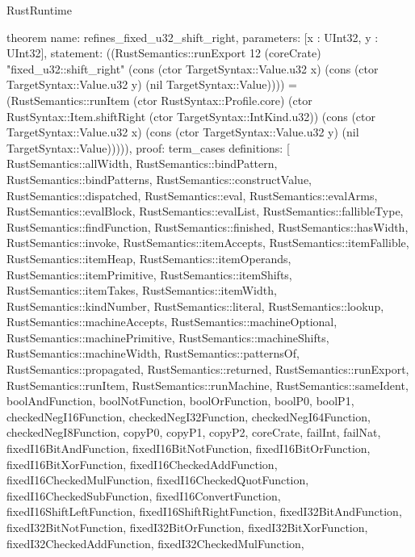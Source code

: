 \begin{lexlean}{RustRuntime}
\begin{semanticmodule}
theorem{
  name: refines_fixed_u32_shift_right,
  parameters: [x : UInt32, y : UInt32],
  statement: ((RustSemantics::runExport 12 (coreCrate) "fixed_u32::shift_right" (cons (ctor TargetSyntax::Value.u32 x) (cons (ctor TargetSyntax::Value.u32 y) (nil TargetSyntax::Value)))) = (RustSemantics::runItem (ctor RustSyntax::Profile.core) (ctor RustSyntax::Item.shiftRight (ctor TargetSyntax::IntKind.u32)) (cons (ctor TargetSyntax::Value.u32 x) (cons (ctor TargetSyntax::Value.u32 y) (nil TargetSyntax::Value))))),
  proof: term_cases{
    definitions: [
      RustSemantics::allWidth,
      RustSemantics::bindPattern,
      RustSemantics::bindPatterns,
      RustSemantics::constructValue,
      RustSemantics::dispatched,
      RustSemantics::eval,
      RustSemantics::evalArms,
      RustSemantics::evalBlock,
      RustSemantics::evalList,
      RustSemantics::fallibleType,
      RustSemantics::findFunction,
      RustSemantics::finished,
      RustSemantics::hasWidth,
      RustSemantics::invoke,
      RustSemantics::itemAccepts,
      RustSemantics::itemFallible,
      RustSemantics::itemHeap,
      RustSemantics::itemOperands,
      RustSemantics::itemPrimitive,
      RustSemantics::itemShifts,
      RustSemantics::itemTakes,
      RustSemantics::itemWidth,
      RustSemantics::kindNumber,
      RustSemantics::literal,
      RustSemantics::lookup,
      RustSemantics::machineAccepts,
      RustSemantics::machineOptional,
      RustSemantics::machinePrimitive,
      RustSemantics::machineShifts,
      RustSemantics::machineWidth,
      RustSemantics::patternsOf,
      RustSemantics::propagated,
      RustSemantics::returned,
      RustSemantics::runExport,
      RustSemantics::runItem,
      RustSemantics::runMachine,
      RustSemantics::sameIdent,
      boolAndFunction,
      boolNotFunction,
      boolOrFunction,
      boolP0,
      boolP1,
      checkedNegI16Function,
      checkedNegI32Function,
      checkedNegI64Function,
      checkedNegI8Function,
      copyP0,
      copyP1,
      copyP2,
      coreCrate,
      failInt,
      failNat,
      fixedI16BitAndFunction,
      fixedI16BitNotFunction,
      fixedI16BitOrFunction,
      fixedI16BitXorFunction,
      fixedI16CheckedAddFunction,
      fixedI16CheckedMulFunction,
      fixedI16CheckedQuotFunction,
      fixedI16CheckedSubFunction,
      fixedI16ConvertFunction,
      fixedI16ShiftLeftFunction,
      fixedI16ShiftRightFunction,
      fixedI32BitAndFunction,
      fixedI32BitNotFunction,
      fixedI32BitOrFunction,
      fixedI32BitXorFunction,
      fixedI32CheckedAddFunction,
      fixedI32CheckedMulFunction,
}}
\end{semanticmodule}
\end{lexlean}
